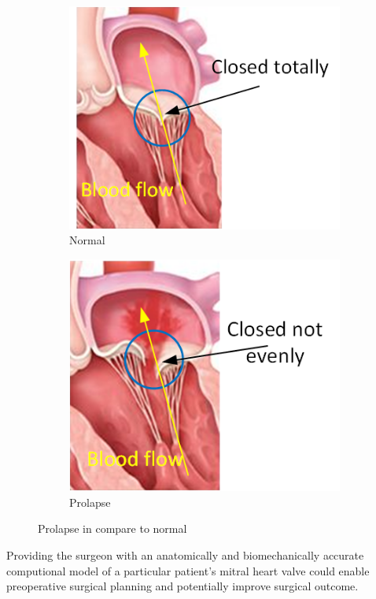 \begin{figure}[H]\label{fig:compareMT}
  \centering
  \begin{subfigure}[H]{0.42\columnwidth}\label{fig:normalMT}
    \includegraphics[width=\columnwidth]{./fig/normalMT.png}
    \caption{Normal}
  \end{subfigure}
  \begin{subfigure}[H]{0.4\columnwidth}\label{fig:prolapseMT}
    \includegraphics[width=\columnwidth]{./fig/prolapseMT.png}
    \caption{Prolapse}
  \end{subfigure}
  \caption{Prolapse in compare to normal}
\end{figure}
Providing the surgeon with an anatomically and biomechanically accurate
computional model of a particular patient's mitral heart valve could enable
preoperative surgical planning and potentially improve surgical outcome.

